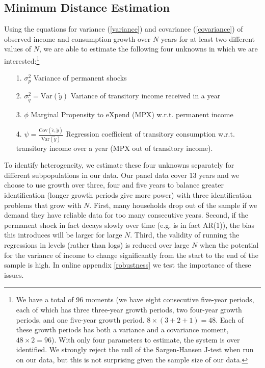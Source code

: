 \documentclass[titlepage]{\econtex}\newcommand{\texname}{ConsumptionHeterogeneity}
\begin{document}
	\subsection{Minimum Distance Estimation}
	Using the equations for variance (\ref{variance}) and covariance (\ref{covariance}) of observed income and consumption growth over $N$ years for at least two different values of $N$, we are able to estimate the following four unknowns in which we are interested:\footnote{We have a total of 96 moments (we have eight consecutive five-year periods, each of which has three three-year growth periods, two four-year growth periods, and one five-year growth period. $8\times(3+2+1)=48$. Each of these growth periods has both a variance and a covariance moment, $48\times 2 = 96$). With only four parameters to estimate, the system is over identified. We strongly reject the null of the Sargen-Hansen J-test when run on our data, but this is not surprising given the sample size of our data.}
	\begin{itemize}
		\item[1.] $\sigma^2_p$ Variance of permanent shocks
		\item[2.] $\sigma^2_{\tilde{q}} = \mathrm{Var}(\tilde{y})$ Variance of transitory income received in a year
		\item[3.] $\phi$ Marginal Propensity to eXpend (MPX) w.r.t. permanent income
		\item[4.] $\psi = \frac{\mathrm{Cov}(\tilde{c},\tilde{y})}{\mathrm{Var}(\tilde{y})}$ Regression coefficient of transitory consumption w.r.t. transitory income over a year (MPX out of transitory income).
	\end{itemize}
	To identify heterogeneity, we estimate these four unknowns separately for different subpopulations in our data. Our panel data cover 13 years and we choose to use growth over three, four and five years to balance greater identification (longer growth periods give more power) with three identification problems that grow with $N$. First, many households drop out of the sample if we demand they have reliable data for too many consecutive years. Second, if the permanent shock in fact decays slowly over time (e.g. is in fact AR(1)), the bias this introduces will be larger for large $N$. Third, the validity of running the regressions in levels (rather than logs) is reduced over large $N$ when the potential for the variance of income to change significantly from the start to the end of the sample is high. In online appendix \ref{robustness} we test the importance of these issues.
	
\end{document}
